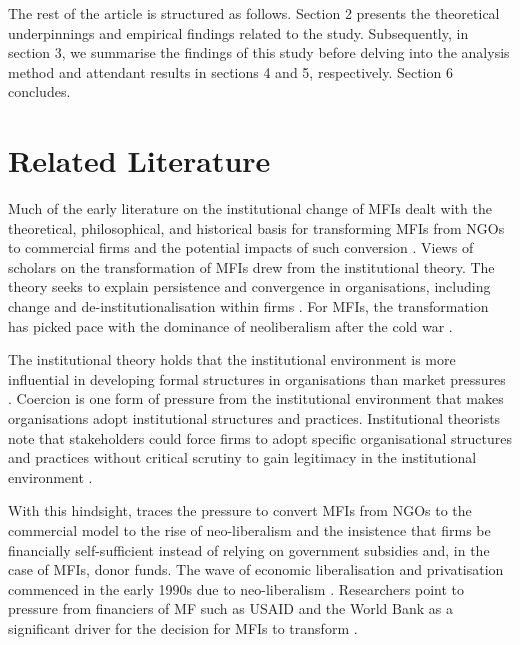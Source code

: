 \documentclass[a4paper,nobind]{templates/ociamthesis}
\begin{document}
The rest of the article is structured as follows. Section 2 presents the theoretical underpinnings and empirical findings related to the study. Subsequently, in section 3, we summarise the findings of this study before delving into the analysis method and attendant results in sections 4 and 5, respectively. Section 6 concludes.

\hypertarget{related-literature}{%
\section{Related Literature}\label{related-literature}}

Much of the early literature on the institutional change of MFIs dealt with the theoretical, philosophical, and historical basis for transforming MFIs from NGOs to commercial firms and the potential impacts of such conversion \autocite{campion1999institutional,christen2001commercialization,gutierrez201920,zaby2019science}. Views of scholars on the transformation of MFIs drew from the institutional theory. The theory seeks to explain persistence and convergence in organisations, including change and de-institutionalisation within firms \autocite{scott2004institutional}. For MFIs, the transformation has picked pace with the dominance of neoliberalism after the cold war \autocite{ostry2017}.

The institutional theory holds that the institutional environment is more influential in developing formal structures in organisations than market pressures \autocite{maggio1991}. Coercion is one form of pressure from the institutional environment that makes organisations adopt institutional structures and practices. Institutional theorists note that stakeholders could force firms to adopt specific organisational structures and practices without critical scrutiny to gain legitimacy in the institutional environment \autocite{scott2004institutional,martinez2017coercive}.

With this hindsight, \textcite{bateman2010doesn} traces the pressure to convert MFIs from NGOs to the commercial model to the rise of neo-liberalism and the insistence that firms be financially self-sufficient instead of relying on government subsidies and, in the case of MFIs, donor funds. The wave of economic liberalisation and privatisation commenced in the early 1990s due to neo-liberalism \autocite{silva1998neoliberalism}. Researchers point to pressure from financiers of MF such as USAID and the World Bank as a significant driver for the decision for MFIs to transform \autocite{ostry2017}.
\end{document}
